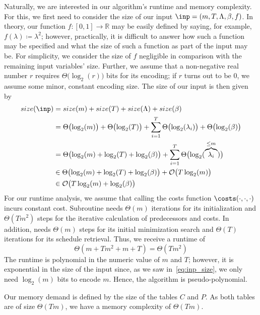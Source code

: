 Naturally, we are interested in our algorithm's runtime and memory complexity.
For this, we first need to consider the size of our input $\inp=(m,T,\Lambda,\beta,f)$. In theory, our function $f:[0,1]\rightarrow \mathbb{R}$ may be easily defined by saying, for example, $f(\lambda)\coloneqq \lambda^2$; however, practically, it is difficult to answer how such a function may be specified and what the size of such a function as part of the input may be. For simplicity, we consider the size of $f$ negligible in comparison with the remaining input variables' size. Further, we assume that a non-negative real number $r$ requires $\Theta\bigl(\log_2(r)\bigr)$ bits for its encoding; if $r$ turns out to be $0$, we assume some minor, constant encoding size. The size of our input is then given by
\begin{align}
	size(\inp)&=size(m)+size(T)+size(\Lambda)+size(\beta)\nonumber\\
	&=\Theta\bigl(\log_2(m)\bigr)+\Theta\bigl(\log_2(T)\bigr)+\sum\limits_{i=1}^T \Theta\bigl(\log_2(\lambda_i)\bigr)+\Theta\bigl(\log_2(\beta)\bigr)\nonumber\\
	&=\Theta\bigl(\log_2(m)+\log_2(T)+\log_2(\beta)\bigr)+\sum\limits_{i=1}^T \Theta\bigl(\log_2(\overbrace{\lambda_i}^{\le m})\bigr)\nonumber\\
	&\in\Theta\bigl(\log_2(m)+\log_2(T)+\log_2(\beta)\bigr)+\mathcal{O}\bigl(T\log_2(m)\bigr)\nonumber\\
	&\in\mathcal{O}\bigl(T\log_2(m)+\log_2(\beta)\bigr)\label{eq:inp_size}
\end{align}
For our runtime analysis, we assume that calling the costs function $\costs(\cdot,\cdot,\cdot)$ incurs constant cost. Subroutine  needs $\Theta(m)$ iterations for its initialization and $\Theta(Tm^2)$ steps for the iterative calculation of predecessors and costs. In addition,  needs $\Theta(m)$ steps for its initial minimization search and $\Theta(T)$ iterations for its schedule retrieval. Thus, we receive a runtime of 
\begin{equation*}
	\Theta(m+Tm^2+m+T)=\Theta(Tm^2)
\end{equation*}
The runtime is polynomial in the numeric value of $m$ and $T$; however, it is exponential in the size of the input since, as we saw in~\eqref{eq:inp_size}, we only need $\log_2(m)$ bits to encode $m$. Hence, the algorithm is pseudo-polynomial.

Our memory demand is defined by the size of the tables $C$ and $P$. As both tables are of size $\Theta(Tm)$, we have a memory complexity of $\Theta(Tm)$.

